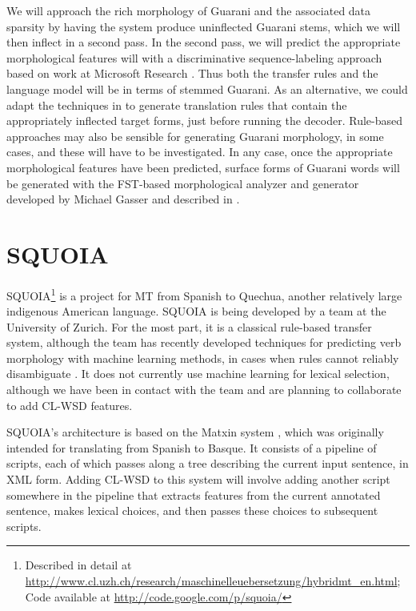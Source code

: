 We will approach the rich morphology of Guarani and the associated data
sparsity by having the system produce uninflected Guarani stems, which we will
then inflect in a second pass.
In the second pass, we will predict the appropriate morphological features will
with a discriminative sequence-labeling approach based on work at Microsoft
Research \cite{toutanova-suzuki-ruopp:2008:ACLMain}.
Thus both the transfer rules and the language model will be in terms of stemmed
Guarani.
As an alternative, we could adapt the techniques in
\cite{chahuneau:2013:emnlp} to generate translation rules that contain the
appropriately inflected target forms, just before running the decoder.
Rule-based approaches may also be sensible for generating Guarani morphology,
in some cases, and these will have to be investigated. In any case, once the
appropriate morphological features have been predicted, surface forms of
Guarani words will be generated with the FST-based morphological analyzer and
generator developed by Michael Gasser and described in
\cite{rudnick-gasser:2013:HyTra-2013}.

\section{SQUOIA}
SQUOIA\footnote{Described in detail at
\url{http://www.cl.uzh.ch/research/maschinelleuebersetzung/hybridmt_en.html}; 
Code available at \url{http://code.google.com/p/squoia/}}
is a project for MT from Spanish to Quechua, another relatively large
indigenous American language. SQUOIA is being developed by a team at the
University of Zurich. For the most part, it is a classical rule-based transfer
system, although the team has recently developed techniques for predicting verb
morphology with machine learning methods, in cases when rules cannot reliably
disambiguate \cite{riosgonzales-gohring:2013:HyTra}. It does not currently use
machine learning for lexical selection, although we have been in contact with
the team and are planning to collaborate to add CL-WSD features.

SQUOIA's architecture is based on the Matxin system \cite{matxin_2005}, which
was originally intended for translating from Spanish to Basque.
It consists of a pipeline of scripts, each of which passes along a tree
describing the current input sentence, in XML form. Adding CL-WSD to this
system will involve adding another script somewhere in the pipeline that
extracts features from the current annotated sentence, makes lexical choices,
and then passes these choices to subsequent scripts.

